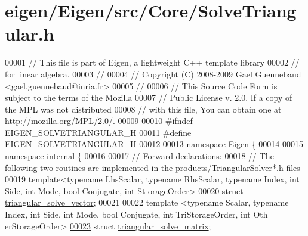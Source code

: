 \hypertarget{eigen_2_eigen_2src_2_core_2_solve_triangular_8h_source}{}\section{eigen/\+Eigen/src/\+Core/\+Solve\+Triangular.h}
\label{eigen_2_eigen_2src_2_core_2_solve_triangular_8h_source}

\begin{DoxyCode}
00001 \textcolor{comment}{// This file is part of Eigen, a lightweight C++ template library}
00002 \textcolor{comment}{// for linear algebra.}
00003 \textcolor{comment}{//}
00004 \textcolor{comment}{// Copyright (C) 2008-2009 Gael Guennebaud <gael.guennebaud@inria.fr>}
00005 \textcolor{comment}{//}
00006 \textcolor{comment}{// This Source Code Form is subject to the terms of the Mozilla}
00007 \textcolor{comment}{// Public License v. 2.0. If a copy of the MPL was not distributed}
00008 \textcolor{comment}{// with this file, You can obtain one at http://mozilla.org/MPL/2.0/.}
00009 
00010 \textcolor{preprocessor}{#ifndef EIGEN\_SOLVETRIANGULAR\_H}
00011 \textcolor{preprocessor}{#define EIGEN\_SOLVETRIANGULAR\_H}
00012 
00013 \textcolor{keyword}{namespace }\hyperlink{namespace_eigen}{Eigen} \{ 
00014 
00015 \textcolor{keyword}{namespace }\hyperlink{namespaceinternal}{internal} \{
00016 
00017 \textcolor{comment}{// Forward declarations:}
00018 \textcolor{comment}{// The following two routines are implemented in the products/TriangularSolver*.h files}
00019 \textcolor{keyword}{template}<\textcolor{keyword}{typename} LhsScalar, \textcolor{keyword}{typename} RhsScalar, \textcolor{keyword}{typename} Index, \textcolor{keywordtype}{int} S\textcolor{keywordtype}{id}e, \textcolor{keywordtype}{int} Mode, \textcolor{keywordtype}{bool} Conjugate, \textcolor{keywordtype}{int} St
      orageOrder>
\hyperlink{struct_eigen_1_1internal_1_1triangular__solve__vector}{00020} \textcolor{keyword}{struct }\hyperlink{struct_eigen_1_1internal_1_1triangular__solve__vector}{triangular\_solve\_vector};
00021 
00022 \textcolor{keyword}{template} <\textcolor{keyword}{typename} Scalar, \textcolor{keyword}{typename} Index, \textcolor{keywordtype}{int} S\textcolor{keywordtype}{id}e, \textcolor{keywordtype}{int} Mode, \textcolor{keywordtype}{bool} Conjugate, \textcolor{keywordtype}{int} TriStorageOrder, \textcolor{keywordtype}{int} Oth
      erStorageOrder>
\hyperlink{struct_eigen_1_1internal_1_1triangular__solve__matrix}{00023} \textcolor{keyword}{struct }\hyperlink{struct_eigen_1_1internal_1_1triangular__solve__matrix}{triangular\_solve\_matrix};

\end{DoxyCode}
